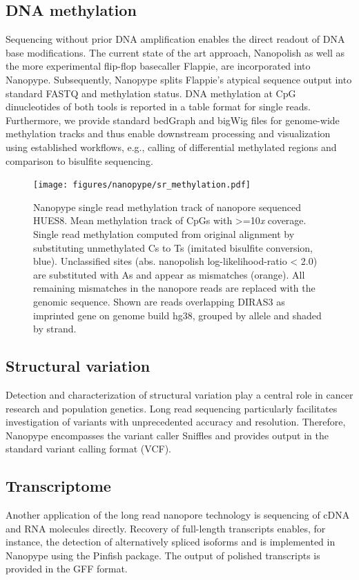 \subsection{DNA methylation}
\label{subsec:nanopype:methylation}
Sequencing without prior DNA amplification enables the direct readout of DNA base modifications. The current state of the art approach, Nanopolish \cite{Simpson2017} as well as the more experimental flip-flop basecaller Flappie, are incorporated into Nanopype. Subsequently, Nanopype splits Flappie’s atypical sequence output into standard FASTQ and methylation status. DNA methylation at CpG dinucleotides of both tools is reported in a table format for single reads. Furthermore, we provide standard bedGraph and bigWig files for genome-wide methylation tracks and thus enable downstream processing and visualization using established workflows, e.g., calling of differential methylated regions and comparison to bisulfite sequencing.

\begin{figure}[h]
	\centering
	\texttt{[image: figures/nanopype/sr\_methylation.pdf]}
	\captionsetup{format=plain}
	\caption[Nanopype single read methylation track]{Nanopype single read methylation track of nanopore sequenced HUES8. Mean methylation track of CpGs with >=10\textit{x} coverage. Single read methylation computed from original alignment by substituting unmethylated Cs to Ts (imitated bisulfite conversion, blue). Unclassified sites (abs. nanopolish log-likelihood-ratio < 2.0) are substituted with As and appear as mismatches (orange). All remaining mismatches in the nanopore reads are replaced with the genomic sequence. Shown are reads overlapping DIRAS3 as imprinted gene on genome build hg38, grouped by allele and shaded by strand.}
	\label{fig:nanopype:sr_methylation}
\end{figure}


\subsection{Structural variation}
\label{subsec:nanopype:sv}
Detection and characterization of structural variation play a central role in cancer research and population genetics. Long read sequencing particularly facilitates investigation of variants with unprecedented accuracy and resolution. Therefore, Nanopype encompasses the variant caller Sniffles \cite{Sedlazeck2018} and provides output in the standard variant calling format (VCF).


\subsection{Transcriptome}
\label{subsec:nanopype:transcriptom}
Another application of the long read nanopore technology is sequencing of cDNA and RNA molecules directly. Recovery of full-length transcripts enables, for instance, the detection of alternatively spliced isoforms and is implemented in Nanopype using the Pinfish package. The output of polished transcripts is provided in the GFF format.

